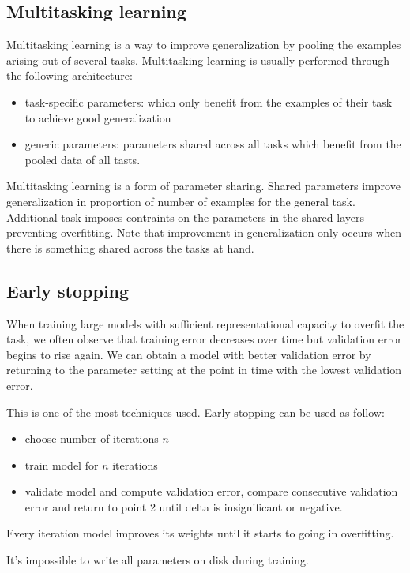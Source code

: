\subsection{Multitasking learning}
Multitasking learning is a way to improve generalization by pooling the 
examples arising out of several tasks. Multitasking learning is usually performed 
through the following architecture:
\begin{itemize}
    \item task-specific parameters: which only benefit from the examples of their
    task to achieve good generalization
    \item generic parameters: parameters shared across all tasks which benefit from 
    the pooled data of all tasts.
\end{itemize}
Multitasking learning is a form of parameter sharing. Shared parameters improve 
generalization in proportion of number of examples for the general task. Additional 
task imposes contraints on the parameters in the shared layers preventing overfitting.
Note that improvement in generalization only occurs when there is something shared across
the tasks at hand.

\subsection{Early stopping}
When training large models with sufficient representational capacity to overfit 
the task, we often observe that training error decreases over time but validation 
error begins to rise again. We can obtain a model with better validation error by
returning to the parameter setting at the point in time with the lowest validation 
error.

This is one of the most techniques used. Early stopping can be used as follow:
\begin{itemize}
    \item choose number of iterations $n$
    \item train model for $n$ iterations 
    \item validate model and compute validation error, compare consecutive validation
    error and return to point 2 until delta is insignificant or negative.
\end{itemize}
Every iteration model improves its weights until it starts to going in overfitting.
\begin{note}
    It's impossible to write all parameters on disk during training.
\end{note}

